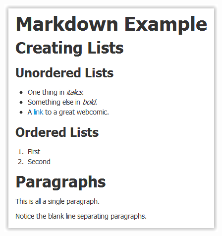 \documentclass[12pt]{article}
\newenvironment{mdh1}
    {
        \begin{changemargin}{0cm}{0cm}
        \begin{bfseries}
        \setlength{\parskip}{1.2em}
        \fontfamily{lmss}
        \fontsize{1.2cm}{1em}
        \selectfont
    }
    {
        \end{bfseries}
        \end{changemargin}
        \par
    }
\newenvironment{mdh2}
    {
        \begin{changemargin}{0cm}{0cm}
        \begin{bfseries}
        \setlength{\parskip}{1.2em}
        \fontfamily{lmss}
        \fontsize{1cm}{1em}
        \selectfont
    }
    {
        \end{bfseries}
        \end{changemargin}
        \par
    }
\newenvironment{mdh3}
    {
        \begin{changemargin}{0cm}{0cm}
        \begin{bfseries}
        \setlength{\parskip}{1.2em}
        \fontfamily{lmss}
        \fontsize{.8cm}{1em}
        \selectfont
    }
    {
        \end{bfseries}
        \end{changemargin}
        \par
    }
\newenvironment{mdstyle}
    {
        \setlength{\parskip}{1em}
        \fontfamily{lmss}
        \selectfont
    }
    {
        \par
    }
\begin{document}
\includegraphics{imgs/md01.PNG}

\end{document}
